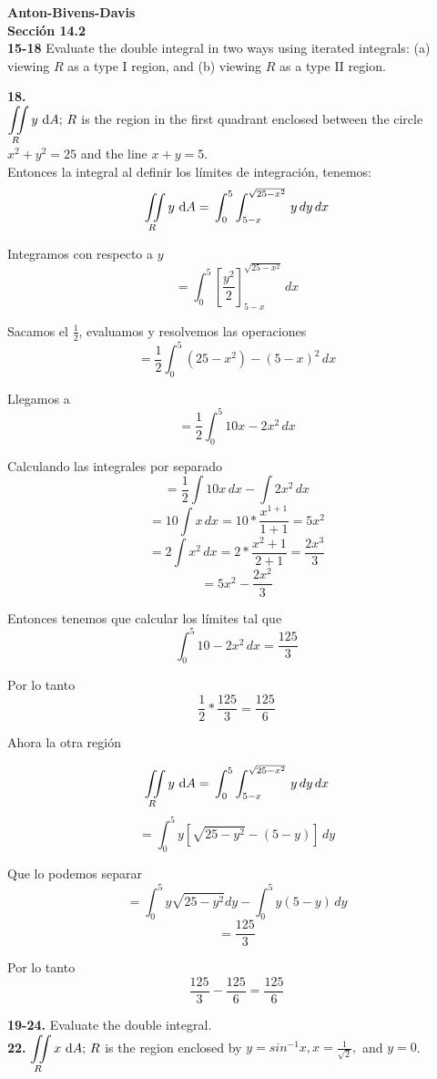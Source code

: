 \documentclass[11pt]{report}
\begin{document}
\textbf{Anton-Bivens-Davis} \\

\textbf{Sección 14.2} \\
\textbf{15-18} Evaluate the double integral in two ways using iterated integrals:
(a) viewing $R$ as a type I region, and (b) viewing $R$ as a type II region.

\textbf{18.} \\

$ {\displaystyle \iint \limits_R } \, y \, \, \text dA; \, R$ is the region in the first
quadrant enclosed between the circle $x^2 + y^2 = 25$ and the line $x + y = 5$. \\
Entonces la integral al definir los límites de integración, tenemos:
$${\displaystyle \iint \limits_R } \, y \, \, \text dA = \, \int_{0}^{5} \int_{5-x}^{\sqrt{25 - x^2}} \, y\,dy\,dx$$

Integramos con respecto a $y$
$$ = \int_{0}^{5} \left[ \frac{y^2}{2} \right]_{5-x}^{\sqrt{25 - x^2}} \, dx$$

Sacamos el $\frac{1}{2}$, evaluamos y resolvemos las operaciones
$$ = \frac{1}{2} \int_{0}^{5} \left(25-x^2\right) - \left(5-x\right)^2 \, dx$$

Llegamos a
$$ = \frac{1}{2} \int_{0}^{5} 10x - 2x^2 \, dx$$


Calculando las integrales por separado
$$ = \frac{1}{2} \int 10x\, dx - \int 2x^2\,dx$$
$$ = 10 \int x\,dx = 10 * \frac{x^{1+1}}{1+1} = 5x^2$$
$$ = 2 \int x^2 \, dx = 2 * \frac{x^2+1}{2+1} = \frac{2x^3}{3}$$
$$ =  5x^2 - \frac{2x^2}{3}$$

Entonces tenemos que calcular los límites tal que
$$\int_{0}^{5} 10-2x^2\,dx = \frac{125}{3}$$

Por lo tanto
$$\frac{1}{2} * \frac{125}{3} = \frac{125}{6}$$


Ahora la otra región

$${\displaystyle \iint \limits_R } \, y \, \, \text dA = \, \int_{0}^{5} \int_{5-x}^{\sqrt{25 - x^2}} \, y\,dy\,dx$$
$$ = \int_{0}^{5} y [\sqrt{25-y^2} - (5-y)] \, dy$$

Que lo podemos separar
$$ = \int_{0}^{5} y \sqrt{25-y^2} dy - \int_{0}^{5} y(5-y) \, dy $$
$$ = \frac{125}{3}$$

Por lo tanto
$$\frac{125}{3} - \frac{125}{6} = \frac{125}{6}$$



\textbf{19-24.} Evaluate the double integral. \\

\textbf{22.} $ {\displaystyle \iint \limits_R } \, x \, \, \text dA; \, R$ is the region
enclosed by $y = sin^{-1} x, x = \frac{1}{\sqrt{2}},$ and $y = 0$. \\
\end{document}
